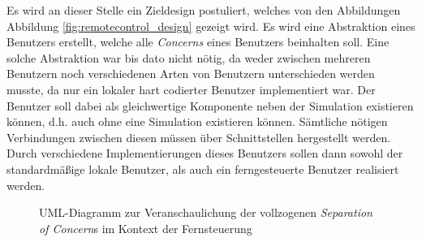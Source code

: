 Es wird an dieser Stelle ein Zieldesign postuliert, welches von den Abbildungen Abbildung \ref{fig:remotecontrol_design} gezeigt wird. Es wird eine Abstraktion eines Benutzers erstellt, welche alle \textit{Concerns} eines Benutzers beinhalten soll. Eine solche Abstraktion war bis dato nicht nötig, da weder zwischen mehreren Benutzern noch verschiedenen Arten von Benutzern unterschieden werden musste, da nur ein lokaler hart codierter Benutzer implementiert war.
Der Benutzer soll dabei als gleichwertige Komponente neben der Simulation existieren können, d.h. auch ohne eine Simulation existieren können. Sämtliche nötigen Verbindungen zwischen diesen müssen über Schnittstellen hergestellt werden.
Durch verschiedene Implementierungen dieses Benutzers sollen dann sowohl der standardmäßige lokale Benutzer, als auch ein ferngesteuerte Benutzer realisiert werden.

\begin{figure}

\centering
{}
\caption{UML-Diagramm zur Veranschaulichung der vollzogenen \textit{Separation of Concern}s im Kontext der Fernsteuerung}
\label{fig:remotecontrol_separation}
\end{figure}

